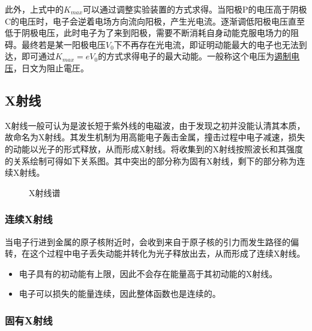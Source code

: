 此外，上式中的$K_{max}$可以通过调整实验装置的方式求得。当阳极P的电压高于阴极C的电压时，电子会逆着电场方向流向阳极，产生光电流。逐渐调低阳极电压直至低于阴极电压，此时电子为了来到阳极，需要不断消耗自身动能克服电场力的阻碍。最终若是某一阳极电压$V_0$下不再存在光电流，即证明动能最大的电子也无法到达，即可通过$K_{max}=eV_0$的方式求得电子的最大动能。一般称这个电压为\underline{遏制电压}，日文为阻止電圧。

\subsection{X射线}

X射线一般可认为是波长短于紫外线的电磁波，由于发现之初并没能认清其本质，故命名为X射线。其发生机制为用高能电子轰击金属，撞击过程中电子减速，损失的动能以光子的形式释放，从而形成X射线。将收集到的X射线按照波长和其强度的关系绘制可得如下关系图。其中突出的部分称为固有X射线，剩下的部分称为连续X射线。
\begin{figure}[ht!]
    \centering
    \caption{X射线谱}
\end{figure}

\subsubsection{连续X射线}

当电子行进到金属的原子核附近时，会收到来自于原子核的引力而发生路径的偏转，在这个过程中电子丢失动能并转化为光子释放出去，从而形成了连续X射线。
\begin{itemize}
    \item 电子具有的初动能有上限，因此不会存在能量高于其初动能的X射线。
    \item 电子可以损失的能量连续，因此整体函数也是连续的。
\end{itemize}

\subsubsection{固有X射线}

